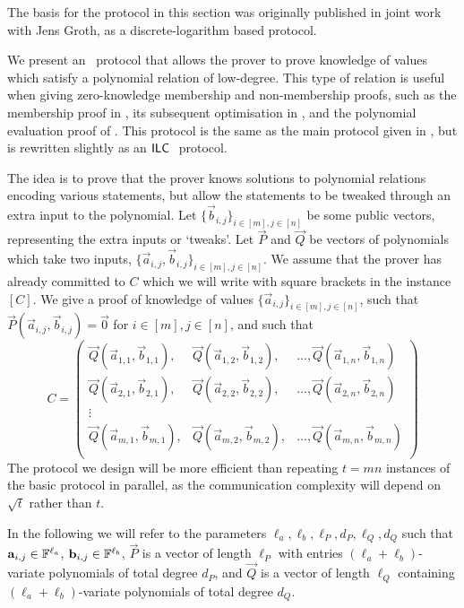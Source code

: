 The basis for the protocol in this section was originally published in joint work \cite{BootleG18} with Jens Groth, as a discrete-logarithm based protocol.

We present an \ILC\ protocol that allows the prover to prove knowledge of values which satisfy a polynomial relation of low-degree. This type of relation is useful when giving zero-knowledge membership and non-membership proofs, such as the membership proof in \cite{GrothK15}, its subsequent optimisation in \cite{BootleCCGGP15}, and the polynomial evaluation proof of \cite{BayerG13}. This protocol is the same as the main protocol given in \cite{BootleG18}, but is rewritten slightly as an $\mathsf{ILC}~$ protocol.

The idea is to prove that the prover knows solutions to polynomial relations encoding various statements, but allow the statements to be tweaked through an extra input to the polynomial. Let $\lbrace \vec{b}_{i,j} \rbrace_{i\in[m],j\in[n]}$ be some public vectors, representing the extra inputs or `tweaks'. Let $\vec{P}$ and $\vec{Q}$ be vectors of polynomials which take two inputs, $\lbrace \vec{a}_{i,j}, \vec{b}_{i,j} \rbrace_{i\in[m],j\in[n]}$. We assume that the prover has already committed to $C$ which we will write with square brackets in the instance $[C]$. We give a proof of knowledge of values $\lbrace \vec{a}_{i,j} \rbrace_{i\in[m],j\in[n]}$, such that $\vec{P}(\vec{a}_{i,j},\vec{b}_{i,j})=\vec{0}$ for $i \in [m], j \in [n]$, and such that
$$C = \left(\begin{array}{lll}
\vec{Q}(\vec{a}_{1,1},\vec{b}_{1,1}),&\vec{Q}(\vec{a}_{1,2},\vec{b}_{1,2}),& \ldots,\vec{Q}(\vec{a}_{1,n},\vec{b}_{1,n}) \\
\vec{Q}(\vec{a}_{2,1},\vec{b}_{2,1}),&\vec{Q}(\vec{a}_{2,2},\vec{b}_{2,2}),& \ldots,\vec{Q}(\vec{a}_{2,n},\vec{b}_{2,n}) \\
\vdots \\
\vec{Q}(\vec{a}_{m,1},\vec{b}_{m,1}),&\vec{Q}(\vec{a}_{m,2},\vec{b}_{m,2}),& \ldots,\vec{Q}(\vec{a}_{m,n},\vec{b}_{m,n}) \\
\end{array}\right)$$
The protocol we design will be more efficient than repeating $t=mn$ instances of the basic protocol in parallel, as the communication complexity will depend on $\sqrt{t}$ rather than $t$.

In the following we will refer to the parameters $\ell_a,\ell_b,\ell_P,d_P,\ell_Q,d_Q$ such that $\mathbf{a}_{i,j}\in \mathbb{F}^{\ell_a}$, $\mathbf{b}_{i,j}\in \mathbb{F}^{\ell_b}$, $\vec{P}$ is a vector of length $\ell_P$ with entries $(\ell_a+\ell_b)$-variate polynomials of total degree $d_P$, and $\vec{Q}$ is a vector of length $\ell_Q$ containing $(\ell_a+\ell_b)$-variate polynomials of total degree $d_Q$.

